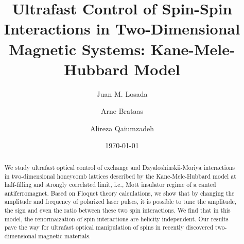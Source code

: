 \documentclass[aps,prl,twocolumn,amsmath,amssymb,nobibnotes]{revtex4-1}%
\begin{document}
\title{Ultrafast Control of Spin-Spin Interactions in Two-Dimensional Magnetic Systems: Kane-Mele-Hubbard Model}

\author{Juan M. Losada}
\author{Arne Brataas}
\author{Alireza Qaiumzadeh}

\begin{abstract}
We study ultrafast optical control of exchange and Dzyaloshinskii-Moriya interactions in two-dimensional honeycomb lattices described by the Kane-Mele-Hubbard model at half-filling and strongly correlated limit, i.e., Mott insulator regime of a canted antiferromagnet. Based on Floquet theory calculations, we show that by changing the amplitude and frequency of polarized laser pulses, it is possible to tune the amplitude, the sign and even the ratio between these two spin interactions. We find that in this model, the renormaization of spin interactions are helicity independent. Our results pave the way for ultrafast optical manipulation of spins in recently discovered two-dimensional magnetic materials.
\end{abstract}

\date{\today}
\maketitle
\end{document}
